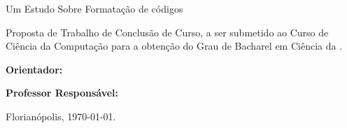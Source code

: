 


\begin{titlepage}

    \center




    \Author



    \bigskip
    Um Estudo Sobre Formatação de códigos\\[3cm]

    \begin{flushright}

        \begin{minipage}{0.518\textwidth}

            Proposta de Trabalho de Conclusão de Curso,
            a ser submetido ao Curso de Ciência da Computação
            para a obtenção do Grau de Bacharel em Ciência da .

            \medskip
            {\bfseries Orientador:} \hfill \Advisor

            \medskip
            {\bfseries Professor Responsável:} \hfill \Supervisor

        \end{minipage}

    \end{flushright}


    Florianópolis, \today.

\end{titlepage}






